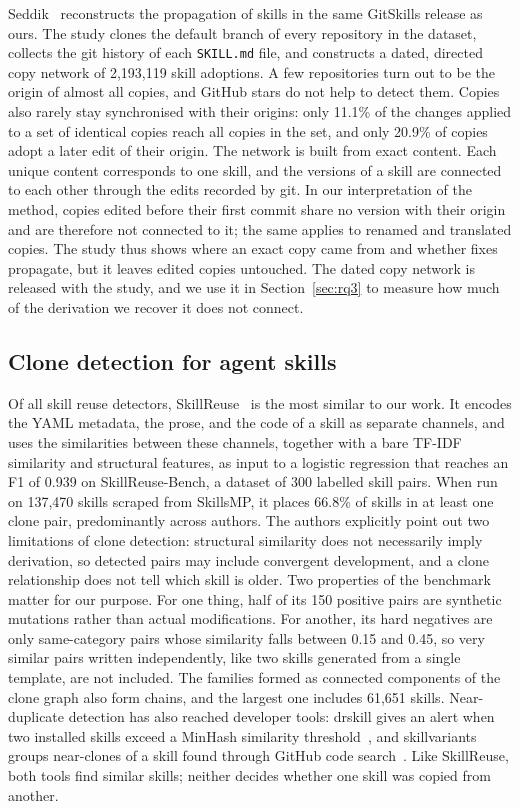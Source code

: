 \documentclass[sigconf,screen]{acmart}
\begin{document}
Seddik~\cite{seddik2026constellations} reconstructs the propagation of skills in the same GitSkills release as ours. The study clones the default branch of every repository in the dataset, collects the git history of each \texttt{SKILL.md} file, and constructs a dated, directed copy network of 2,193,119 skill adoptions. A few repositories turn out to be the origin of almost all copies, and GitHub stars do not help to detect them. Copies also rarely stay synchronised with their origins: only 11.1\% of the changes applied to a set of identical copies reach all copies in the set, and only 20.9\% of copies adopt a later edit of their origin. The network is built from exact content. Each unique content corresponds to one skill, and the versions of a skill are connected to each other through the edits recorded by git. In our interpretation of the method, copies edited before their first commit share no version with their origin and are therefore not connected to it; the same applies to renamed and translated copies. The study thus shows where an exact copy came from and whether fixes propagate, but it leaves edited copies untouched. The dated copy network is released with the study, and we use it in Section~\ref{sec:rq3} to measure how much of the derivation we recover it does not connect.

\subsection{Clone detection for agent skills}

Of all skill reuse detectors, SkillReuse~\cite{zhu2026skillreuse} is the most similar to our work. It encodes the YAML metadata, the prose, and the code of a skill as separate channels, and uses the similarities between these channels, together with a bare TF-IDF similarity and structural features, as input to a logistic regression that reaches an F1 of 0.939 on SkillReuse-Bench, a dataset of 300 labelled skill pairs. When run on 137,470 skills scraped from SkillsMP, it places 66.8\% of skills in at least one clone pair, predominantly across authors. The authors explicitly point out two limitations of clone detection: structural similarity does not necessarily imply derivation, so detected pairs may include convergent development, and a clone relationship does not tell which skill is older. Two properties of the benchmark matter for our purpose. For one thing, half of its 150 positive pairs are synthetic mutations rather than actual modifications. For another, its hard negatives are only same-category pairs whose similarity falls between 0.15 and 0.45, so very similar pairs written independently, like two skills generated from a single template, are not included. The families formed as connected components of the clone graph also form chains, and the largest one includes 61,651 skills. Near-duplicate detection has also reached developer tools: drskill gives an alert when two installed skills exceed a MinHash similarity threshold~\cite{drskill}, and skillvariants groups near-clones of a skill found through GitHub code search~\cite{skillvariants}. Like SkillReuse, both tools find similar skills; neither decides whether one skill was copied from another.
\end{document}
